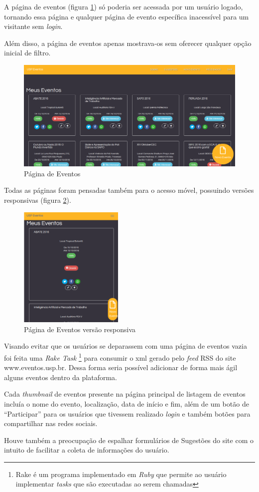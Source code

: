		\par A página de eventos (figura \ref{fig:events_pagev1}) só poderia ser acessada por um usuário logado, tornando essa página e qualquer página de evento específica inacessível para um visitante sem \emph{login}.
		\par Além disso, a página de eventos apenas mostrava-os sem oferecer qualquer opção inicial de filtro.
        \begin{figure}[htb]
        \centering
		\includegraphics[width=15cm]{figuras/events_pagev1}
		\caption{\label{fig:events_pagev1} Página de Eventos}
		\end{figure}
\par Todas as páginas foram pensadas também para o acesso móvel, possuindo versões responsivas (figura \ref{fig:events_pagev1_responsive}).
        \begin{figure}[htb]
        \centering
		\includegraphics[width=5cm]{figuras/events_pagev1_responsive}
		\caption{\label{fig:events_pagev1_responsive} Página de Eventos versão responsiva}
		\end{figure}
\par Visando evitar que os usuários se deparassem com uma página de eventos vazia foi feita uma \emph{Rake Task} \footnote{Rake é um programa implementado em \emph{Ruby} que permite ao usuário implementar \emph{tasks} que são executadas ao serem chamadas} para consumir o xml gerado pelo \emph{feed} RSS do site www.eventos.usp.br. Dessa forma seria possível adicionar de forma mais ágil alguns eventos dentro da plataforma.
\par Cada \emph{thumbnail} de eventos presente na página principal de listagem de eventos incluía o nome do evento, localização, data de início e fim, além de um botão de ``Participar'' para os usuários que tivessem realizado \emph{login} e também botões para compartilhar nas redes sociais.
\par Houve também a preocupação de espalhar formulários de Sugestões do site com o intuito de facilitar a coleta de informações do usuário.
